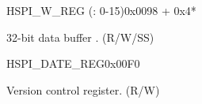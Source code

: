 \begin{register}{H}{SPI\_W\_REG (: 0-15)}{0x0098 + 0x4*}\label{regdesc:SPIW0REG}
%
\regnewline%
\begin{regdesc}\begin{reglist}
\label{fielddesc:SPIBUF0}\item [SPI\_BUF\regindex{n}] 32-bit data buffer . (R/W/SS)
\end{reglist}\end{regdesc}
\end{register}


\begin{register}{H}{SPI\_DATE\_REG}{0x00F0}\label{regdesc:SPIDATEREG}
%
%
\regnewline%
\begin{regdesc}\begin{reglist}
\label{fielddesc:SPIDATE}\item [SPI\_DATE] Version control register. (R/W)
\end{reglist}\end{regdesc}
\end{register}
